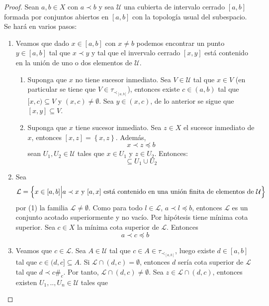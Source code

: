 \documentclass[12pt]{report}
\theoremstyle{largebreak}
\newcommand\contradiction{\ensuremath{\#_c}}
\begin{document}
    \begin{proof}
        Sean $a,b\in X$ con $a\prec b$ y sea $\mathcal{U}$ una cubierta de intervalo cerrado $[a,b]$ formada por conjuntos abiertos en $[a,b]$ con la topología usual del subespacio. Se hará en varios pasos:
        \begin{enumerate}
            \item Veamos que dado $x\in[a,b]$ con $x\neq b$ podemos encontrar un punto $y\in[a,b]$ tal que $x\prec y$ y tal que el invervalo cerrado $[x,y]$ está contenido en la unión de uno o dos elementos de $\mathcal{U}$.
            \begin{enumerate}
                \item Suponga que $x$ no tiene sucesor inmediato. Sea $V\in\mathcal{U}$ tal que $x\in V$ (en particular se tiene que $V\in\tau_{\prec_{[a,b]}}$), entonces existe $c\in(a,b)$ tal que $[x,c)\subseteq V$ y $(x,c)\neq\emptyset$. Sea $y\in(x,c)$, de lo anterior se sigue que $[x,y]\subseteq V$.
                \item Suponga que $x$ tiene sucesor inmediato. Sea $z\in X$ el sucesor inmediato de $x$, entonces $[x,z]=\left\{x,z\right\}$. Además,
                \begin{equation*}
                    x\prec z\preceq b
                \end{equation*}
                sean $U_1,U_2\in\mathcal{U}$ tales que $x\in U_1$ y $z\in U_2$. Entonces:
                \begin{equation*}
                    [x,z]\subseteq U_1\cup U_2
                \end{equation*}
            \end{enumerate}
            \item Sea
            \begin{equation*}
                \mathcal{L}=\left\{x\in[a,b]\Big|a\prec x\textup{ y }[a,x]\textup{ está contenido en una unión finita de elementos de }\mathcal{U} \right\}
            \end{equation*}
            por (1) la familia $\mathcal{L}\neq\emptyset$. Como para todo $l\in\mathcal{L}$, $a\prec l\preceq b$, entonces $\mathcal{L}$ es un conjunto acotado superiormente y no vacío. Por hipótesis tiene mínima cota superior. Sea $c\in X$ la mínima cota superior de $\mathcal{L}$. Entonces
            \begin{equation*}
                a\prec c\preceq b
            \end{equation*}
            \item Veamos que $c\in\mathcal{L}$. Sea $A\in\mathcal{U}$ tal que $c\in A\in\tau_{\prec_{[a,b]}}$, luego existe $d\in[a,b]$ tal que $c\in (d,c]\subseteq A$. Si $\mathcal{L}\cap (d,c)=\emptyset$, entonces $d$ sería cota superior de $\mathcal{L}$ tal que $d\prec c$\contradiction. Por tanto, $\mathcal{L}\cap (d,c)\neq\emptyset$. Sea $z\in\mathcal{L}\cap (d,c)$, entonces existen $U_1,..,U_n\in\mathcal{U}$ tales que

\end{enumerate}
\end{proof}
\end{document}
